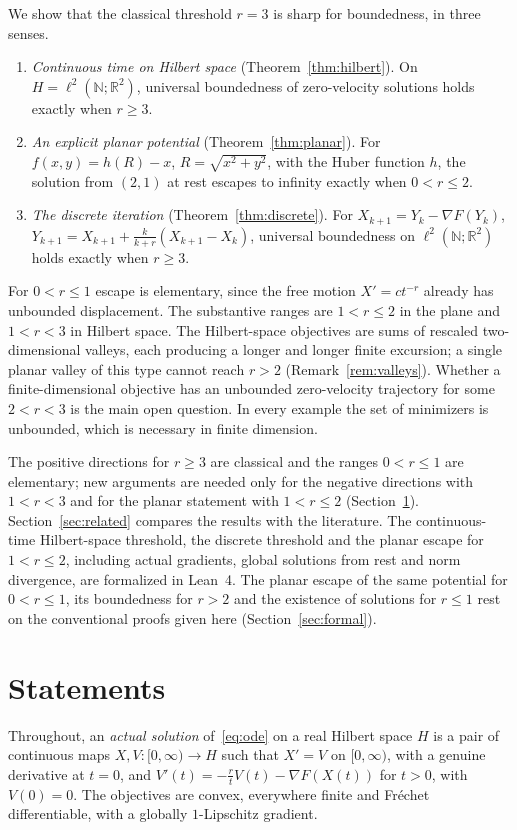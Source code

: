 \documentclass[11pt]{article}
\numberwithin{equation}{section}
\theoremstyle{definition}
\theoremstyle{remark}
\newcommand{\R}{\mathbb R}
\newcommand{\N}{\mathbb N}
\begin{document}
We show that the classical threshold $r=3$ is sharp for boundedness, in three senses.

\begin{enumerate}[leftmargin=1.5em]
\item \emph{Continuous time on Hilbert space} (Theorem~\ref{thm:hilbert}). On $H=\ell^2(\N;\R^2)$, universal boundedness of zero-velocity solutions holds exactly when $r\ge3$.
\item \emph{An explicit planar potential} (Theorem~\ref{thm:planar}). For $f(x,y)=h(R)-x$, $R=\sqrt{x^2+y^2}$, with the Huber function $h$, the solution from $(2,1)$ at rest escapes to infinity exactly when $0<r\le2$.
\item \emph{The discrete iteration} (Theorem~\ref{thm:discrete}). For $X_{k+1}=Y_k-\nabla F(Y_k)$, $Y_{k+1}=X_{k+1}+\frac k{k+r}(X_{k+1}-X_k)$, universal boundedness on $\ell^2(\N;\R^2)$ holds exactly when $r\ge3$.
\end{enumerate}

For $0<r\le1$ escape is elementary, since the free motion $X'=ct^{-r}$ already has unbounded displacement. The substantive ranges are $1<r\le2$ in the plane and $1<r<3$ in Hilbert space. The Hilbert-space objectives are sums of rescaled two-dimensional valleys, each producing a longer and longer finite excursion; a single planar valley of this type cannot reach $r>2$ (Remark~\ref{rem:valleys}). Whether a finite-dimensional objective has an unbounded zero-velocity trajectory for some $2<r<3$ is the main open question. In every example the set of minimizers is unbounded, which is necessary in finite dimension.

The positive directions for $r\ge3$ are classical and the ranges $0<r\le1$ are elementary; new arguments are needed only for the negative directions with $1<r<3$ and for the planar statement with $1<r\le2$ (Section~\ref{sec:statements}). Section~\ref{sec:related} compares the results with the literature. The continuous-time Hilbert-space threshold, the discrete threshold and the planar escape for $1<r\le2$, including actual gradients, global solutions from rest and norm divergence, are formalized in Lean~4. The planar escape of the same potential for $0<r\le1$, its boundedness for $r>2$ and the existence of solutions for $r\le1$ rest on the conventional proofs given here (Section~\ref{sec:formal}).

\section{Statements}\label{sec:statements}
Throughout, an \emph{actual solution} of~\eqref{eq:ode} on a real Hilbert space $H$ is a pair of continuous maps $X,V:[0,\infty)\to H$ such that $X'=V$ on $[0,\infty)$, with a genuine derivative at $t=0$, and $V'(t)=-\frac rtV(t)-\nabla F(X(t))$ for $t>0$, with $V(0)=0$. The objectives are convex, everywhere finite and Fr\'echet differentiable, with a globally $1$-Lipschitz gradient.
\end{document}
